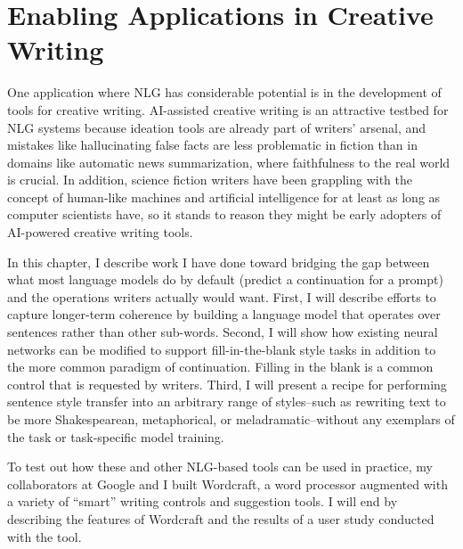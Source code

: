 \chapter{Enabling Applications in Creative Writing}
\label{chap:creativity}
One application where NLG has considerable potential is in the development of tools for creative writing.
AI-assisted creative writing is an attractive testbed for NLG systems because ideation tools are already part of writers' arsenal, and mistakes like hallucinating false facts are less problematic in fiction than in domains like automatic news summarization, where faithfulness to the real world is crucial.
In addition, science fiction writers have been grappling with the concept of human-like machines and artificial intelligence for at least as long as computer scientists have, so it stands to reason they might be early adopters of AI-powered creative writing tools.

In this chapter, I describe work I have done toward bridging the gap between what most language models do by default (predict a continuation for a prompt) and the operations writers actually would want.
First, I will describe efforts to capture longer-term coherence by building a language model that operates over sentences rather than other sub-words.
Second, I will show how existing neural networks can be modified to support fill-in-the-blank style tasks in addition to the more common paradigm of continuation.
Filling in the blank is a common control that is requested by writers.
Third, I will present a recipe for performing sentence style transfer into an arbitrary range of styles--such as rewriting text to be more Shakespearean, metaphorical, or meladramatic--without any exemplars of the task or task-specific model training.

To test out how these and other NLG-based tools can be used in practice, my collaborators at Google and I built Wordcraft, a word processor augmented with a variety of ``smart'' writing controls and suggestion tools.
I will end by describing the features of Wordcraft and the results of a user study conducted with the tool.




